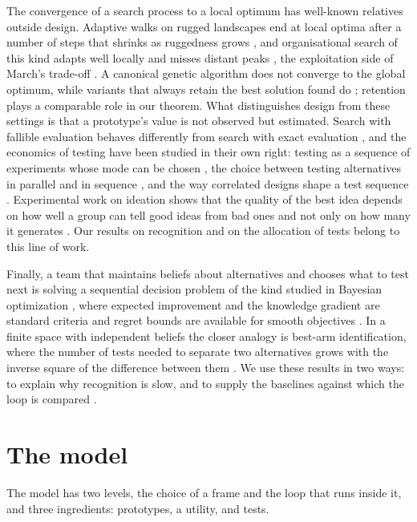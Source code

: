 \documentclass[10pt,twocolumn]{article}
\theoremstyle{definition}
\begin{document}
The convergence of a search process to a local optimum has well-known relatives outside design. Adaptive walks on rugged landscapes end at local optima after a number of steps that shrinks as ruggedness grows \citep{kauffmanlevin1987, kauffman1993}, and organisational search of this kind adapts well locally and misses distant peaks \citep{levinthal1997, levinthalmarch1993}, the exploitation side of March's trade-off \citep{march1991}. A canonical genetic algorithm does not converge to the global optimum, while variants that always retain the best solution found do \citep{rudolph1994}; retention plays a comparable role in our theorem. What distinguishes design from these settings is that a prototype's value is not observed but estimated. Search with fallible evaluation behaves differently from search with exact evaluation \citep{knudsen2007}, and the economics of testing have been studied in their own right: testing as a sequence of experiments whose mode can be chosen \citep{thomke1998}, the choice between testing alternatives in parallel and in sequence \citep{loch2001, dahan2001}, and the way correlated designs shape a test sequence \citep{erat2008}. Experimental work on ideation shows that the quality of the best idea depends on how well a group can tell good ideas from bad ones and not only on how many it generates \citep{girotra2010}. Our results on recognition and on the allocation of tests belong to this line of work.

Finally, a team that maintains beliefs about alternatives and chooses what to test next is solving a sequential decision problem of the kind studied in Bayesian optimization \citep{jones1998, shahriari2016}, where expected improvement and the knowledge gradient \citep{frazier2008, frazier2009} are standard criteria and regret bounds are available for smooth objectives \citep{srinivas2012}. In a finite space with independent beliefs the closer analogy is best-arm identification, where the number of tests needed to separate two alternatives grows with the inverse square of the difference between them \citep{evendar2006, mannor2004, audibert2010}. We use these results in two ways: to explain why recognition is slow, and to supply the baselines against which the loop is compared \citep{auer2002, russo2018}.

\section{The model}
\label{sec:model}

The model has two levels, the choice of a frame and the loop that runs inside it, and three ingredients: prototypes, a utility, and tests.
\end{document}
